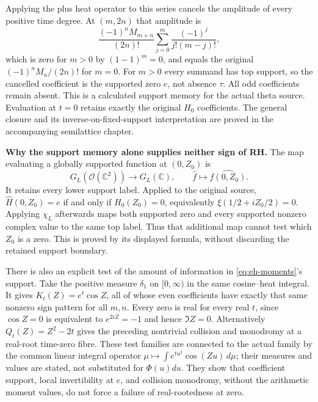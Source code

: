 Applying the plus heat operator to this series cancels the amplitude of
every positive time degree. At $(m,2n)$ that amplitude is
\[
 \frac{(-1)^nM_{m+n}}{(2n)!}
 \sum_{j=0}^m\frac{(-1)^j}{j!(m-j)!},
\]
which is zero for $m>0$ by $(1-1)^m=0$, and equals the original
$(-1)^nM_n/(2n)!$ for $m=0$. For $m>0$ every summand has top
support, so the cancelled coefficient is the supported zero $e$, not
absence $\tau$. All odd coefficients remain absent. This is a
calculated support memory for the actual theta source. Evaluation at
$t=0$ retains exactly the original $H_0$ coefficients. The general
closure and its inverse-on-fixed-support interpretation are proved
in the accompanying semilattice chapter.

\EH\textbf{Why the support memory alone supplies neither sign of RH.}
The map evaluating a globally supported function at $(0,Z_0)$ is
\[
 G_L(\mathcal O(\mathbb C^2))\longrightarrow G_L(\mathbb C),
 \qquad \widehat f\longmapsto\widehat{f(0,Z_0)}.
\]
It retains every lower support label. Applied to the original source,
$\widehat H(0,Z_0)=e$ if and only if $H_0(Z_0)=0$, equivalently
$\xi(1/2+iZ_0/2)=0$. Applying $\chi_L$ afterwards maps both supported
zero and every supported nonzero complex value to the same top label.
Thus that additional map cannot test which $Z_0$ is a zero. This is
proved by its displayed formula, without discarding the retained
support boundary.

There is also an explicit test of the amount of information in
\eqref{eq:eh-moments}'s support. Take the positive measure
$\delta_1$ on $[0,\infty)$ in the same cosine--heat integral. It gives
$K_t(Z)=e^t\cos Z$, all of whose even coefficients have exactly that
same nonzero sign pattern for all $m,n$. Every zero is real for every
real $t$, since $\cos Z=0$ is equivalent to $e^{2iZ}=-1$ and hence
$\Im Z=0$. Alternatively $Q_t(Z)=Z^2-2t$ gives the preceding
nontrivial collision and monodromy at a real-root time-zero fibre.
These test families are connected to the actual family by the common
linear integral operator $\mu\mapsto\int e^{tu^2}\cos(Zu)\,d\mu$;
their measures and values are stated, not substituted for $\Phi(u)du$.
They show that coefficient support, local invertibility at $e$, and
collision monodromy, without the arithmetic moment values, do not
force a failure of real-rootedness at zero.


